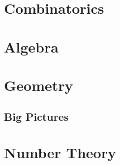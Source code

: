 \documentclass[a4paper, 11pt, oneside]{memoir}
\title{
    \Huge \textbf{BCS Question Bank}
    \HRule{2pt} \\ [.5cm]\
    \Large\signature\\[.5cm]\
    \normalsize \today
}
\begin{document}
\thispagestyle{empty}\printtitle\vfill\newpage

\begingroup{
    \hypersetup{hidelinks}
    \tableofcontents
}\endgroup

\setcounter{page}{1}\newpage



% 



\chapter{Combinatorics}
\thispagestyle{empty}

		
















	

\chapter{Algebra}
\thispagestyle{empty}











\chapter{Geometry}
\thispagestyle{empty}


















\section{Big Pictures}



\chapter{Number Theory}
\thispagestyle{empty}







		



\printindex[prob]
\printindex[thm]
\printindex[cat]
\printindex[strat]
\printindex
\end{document}
